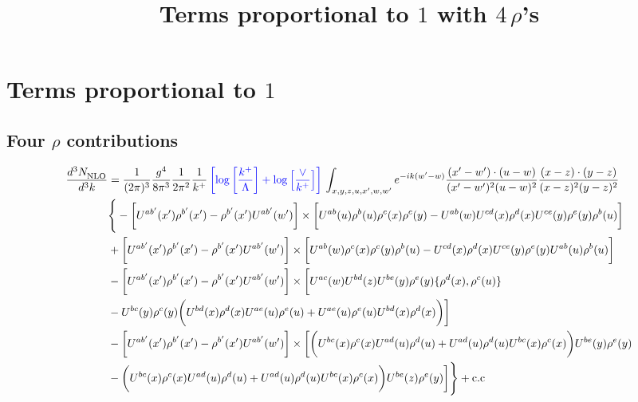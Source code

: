 \documentclass[aps,prd,amsmath,amssymb,nofootinbib]{revtex4-2}
\title{Terms proportional to $1$ with $4\, \rho$'s}
\numberwithin{equation}{section}
\begin{document}
\section{Terms proportional to $1$}
\subsection{Four $\rho$ contributions}
\begin{align} \label{eq:4rho}
    \frac{d^{3}N_{\rm NLO}^{\rm}}{d^{3}k}  & = \frac{1}{(2\pi)^{3}}\frac{g^{4}}{8\pi^{3}}\frac{1}{2\pi^{2}} \frac{1}{k^{+}}\,{\color{blue}\left[\log{\left[\frac{k^{+}}{\Lambda}\right]}+\log{\left[\frac{\vee}{k^{+}}\right]}\right]}\,\int_{x,y,z,u,x^{\prime},w,w^{\prime}}e^{-ik(w^{\prime}-w)}\frac{(x^{\prime}-w^{\prime})\cdot (u-w)}{(x^{\prime}-w^{\prime})^{2} (u-w)^{2}} \frac{(x-z)\cdot (y-z)}{(x-z)^{2}(y-z)^{2}}\notag \\ & \Bigg\{-\bigg[U^{ab^{\prime}}(x^{\prime})\rho^{b^{\prime}}(x^{\prime})-\rho^{b^{\prime}}(x^{\prime})U^{ab^{\prime}}(w^{\prime})\bigg]\times\bigg[U^{ab}(u)\rho^{b}(u)\rho^{c}(x)\rho^{c}(y)-U^{ab}(w)U^{cd}(x)\rho^{d}(x)U^{ce}(y)\rho^{e}(y)\rho^{b}(u)\bigg]\notag \\ & + \bigg[U^{ab^{\prime}}(x^{\prime})\rho^{b^{\prime}}(x^{\prime})-\rho^{b^{\prime}}(x^{\prime})U^{ab^{\prime}}(w^{\prime})\bigg]\times \bigg[U^{ab}(w)\rho^{c}(x)\rho^{c}(y)\rho^{b}(u)-U^{cd}(x)\rho^{d}(x)U^{ce}(y)\rho^{e}(y)U^{ab}(u)\rho^{b}(u)\bigg]\notag \\ & 
    -\bigg[U^{ab^{\prime}}(x^{\prime})\rho^{b^{\prime}}(x^{\prime})-\rho^{b^{\prime}}(x^{\prime})U^{ab^{\prime}}(w^{\prime})\bigg]\times \bigg[U^{ac}(w)U^{bd}(z)U^{be}(y)\rho^{e}(y)\{\rho^{d}(x),\rho^{c}(u)\}\notag \\ &-U^{bc}(y)\rho^{c}(y)\bigg(U^{bd}(x)\rho^{d}(x) U^{ae}(u)\rho^{e}(u)+U^{ae}(u)\rho^{e}(u)U^{bd}(x)\rho^{d}(x)\bigg)\bigg]\notag \\ & - \bigg[U^{ab^{\prime}}(x^{\prime})\rho^{b^{\prime}}(x^{\prime})-\rho^{b^{\prime}}(x^{\prime})U^{ab^{\prime}}(w^{\prime})\bigg]\times \bigg[\bigg(U^{bc}(x)\rho^{c}(x)U^{ad}(u)\rho^{d}(u)+U^{ad}(u)\rho^{d}(u)U^{bc}(x)\rho^{c}(x)\bigg)U^{be}(y)\rho^{e}(y)\notag \\ & -\bigg(U^{bc}(x)\rho^{c}(x)U^{ad}(u)\rho^{d}(u)+U^{ad}(u)\rho^{d}(u)U^{bc}(x)\rho^{c}(x)\bigg)U^{be}(z)\rho^{e}(y)\bigg]\Bigg\}+\rm{c.c} \notag \\ & 

\end{align}
\end{document}

